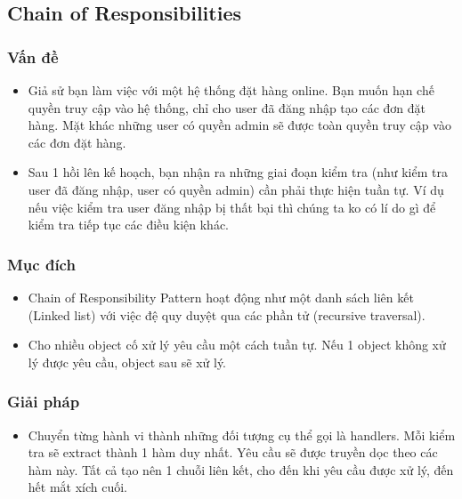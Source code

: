 \thispagestyle{empty}
\subsection{Chain of Responsibilities}
\subsubsection{Vấn đề}
\begin{flushleft}
	\begin{itemize}
		\item Giả sử bạn làm việc với một hệ thống đặt hàng online. Bạn muốn hạn chế quyền truy cập vào hệ thống, chỉ cho user đã đăng nhập tạo các đơn đặt hàng. Mặt khác những user có quyền admin sẽ được toàn quyền truy cập vào các đơn đặt hàng.
		\item Sau 1 hồi lên kế hoạch, bạn nhận ra những giai đoạn kiểm tra (như kiểm tra user đã đăng nhập, user có quyền admin) cần phải thực hiện tuần tự. Ví dụ nếu việc kiểm tra user đăng nhập bị thất bại thì chúng ta ko có lí do gì để kiểm tra tiếp tục các điều kiện khác.
	\end{itemize}
\end{flushleft}

\subsubsection{Mục đích}
\begin{flushleft}
	\begin{itemize}
		\item Chain of Responsibility Pattern hoạt động như một danh sách liên kết (Linked list) với việc đệ quy duyệt qua các phần tử (recursive traversal).
		\item Cho nhiều object cố xử lý yêu cầu một cách tuần tự. Nếu 1 object không xử lý được yêu cầu, object sau sẽ xử lý.
	\end{itemize}
\end{flushleft}

\subsubsection{Giải pháp}
\begin{flushleft}
	\begin{itemize}
		\item Chuyển từng hành vi thành những đối tượng cụ thể gọi là handlers. Mỗi kiểm tra sẽ extract thành 1 hàm duy nhất. Yêu cầu sẽ được truyền dọc theo các hàm này. Tất cả tạo nên 1 chuỗi liên kết, cho đến khi yêu cầu được xử lý, đến hết mắt xích cuối.
	\end{itemize}
\end{flushleft}

